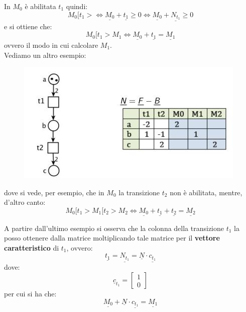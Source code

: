 \documentclass[a4paper,12pt, oneside]{book}
\begin{document}
\begin{definizione}
\begin{esempio}
\begin{figure}[H]
    \end{figure}
    In $M_0$ è abilitata $t_1$ quindi:
    \[M_0[t_1> \Longleftrightarrow \underline{M_0}+\underline{t_1}\geq 0
      \Longleftrightarrow  \underline{M_0}+\underline{N_{t_1}}\geq
      0\]
    e si ottiene che:
    \[M_0[t_1>M_1 \Longleftrightarrow
      \underline{M_0}+\underline{t_1}=\underline{M_1}\]
    ovvero il modo in cui calcolare $M_1$.\\
    Vediamo un altro esempio:
    \begin{figure}[H]
      \centering
      \includegraphics[scale = 0.6]{img/al6.jpg}
    \end{figure}
    dove si vede, per esempio, che in $M_0$ la transizione $t_2$ non è
    abilitata, mentre, d'altro canto:
    \[M_0[t_1>M_1[t_2>M_2\Longleftrightarrow
      \underline{M_0}+\underline{t_1}+\underline{t_2}=\underline{M_2}\] 
  \end{esempio}
  A partire dall'ultimo esempio si osserva che la colonna della transizione
  $t_1$ la posso ottenere dalla matrice moltiplicando tale matrice per il
  \textbf{vettore caratteristico} di $t_1$, ovvero:
  \[\underline{t_1}=\underline{N_{t_1}}=\underline{N}\cdot
    \underline{c_{t_1}}\]
  dove:
  \[
    \underline{c}_{t_1}=\left[\begin{matrix}
        1\\
        0
      \end{matrix}\right]
  \]
  per cui si ha che:
  \[\underline{M_0}+\underline{N}\cdot \underline{c_{t_1}} =\underline{M_1}\]
\end{definizione}
\end{document}
